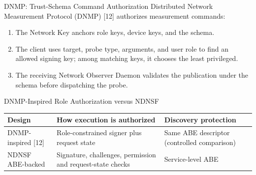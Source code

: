 \begin{frame}{DNMP: Trust-Schema Command Authorization}
\small
Distributed Network Measurement Protocol (DNMP) [12] authorizes measurement commands:
\begin{enumerate}
\item The Network Key anchors role keys, device keys, and the schema.
\item The client uses target, probe type, arguments, and user role to find an allowed signing key; among matching keys, it chooses the least privileged.
\item The receiving Network Observer Daemon validates the publication under the schema before dispatching the probe.
\end{enumerate}
\vspace{2mm}
\end{frame}

\begin{frame}{DNMP-Inspired Role Authorization versus NDNSF}
\small
\begin{tabularx}{\linewidth}{p{.27\linewidth}XX}
\toprule Design & How execution is authorized & Discovery protection\\\midrule
DNMP-inspired [12] & Role-constrained signer plus request state & Same ABE descriptor (controlled comparison)\\\midrule
NDNSF ABE-backed & Signature, challenges, permission and request-state checks & Service-level ABE\\\bottomrule
\end{tabularx}
\vspace{3mm}
\end{frame}

